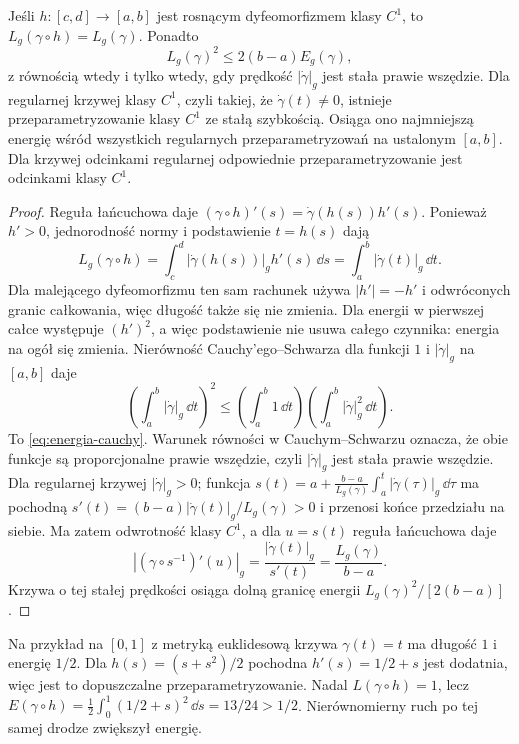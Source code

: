 \begin{stwierdzenie}
\label{prop:energia-dlugosc}
Jeśli $h:[c,d]\to[a,b]$ jest rosnącym dyfeomorfizmem
klasy $C^1$, to
$L_g(\gamma\circ h)=L_g(\gamma)$.
Ponadto
\begin{equation}\label{eq:energia-cauchy}
 L_g(\gamma)^2\leq 2(b-a)E_g(\gamma),
\end{equation}
z równością wtedy i tylko wtedy, gdy prędkość
$|\dot\gamma|_g$ jest stała prawie wszędzie.
Dla regularnej krzywej klasy $C^1$, czyli takiej, że
$\dot\gamma(t)\ne0$, istnieje przeparametryzowanie klasy
$C^1$ ze stałą szybkością. Osiąga ono najmniejszą energię
wśród wszystkich regularnych przeparametryzowań na
ustalonym $[a,b]$. Dla krzywej odcinkami regularnej
odpowiednie przeparametryzowanie jest odcinkami klasy $C^1$.
\end{stwierdzenie}
\begin{proof}
Reguła łańcuchowa daje
$(\gamma\circ h)'(s)=\dot\gamma(h(s))h'(s)$.
Ponieważ $h'>0$, jednorodność normy i podstawienie
$t=h(s)$ dają
\[
 L_g(\gamma\circ h)
 =\int_c^d|\dot\gamma(h(s))|_g h'(s)\,\dd s
 =\int_a^b|\dot\gamma(t)|_g\,\dd t.
\]
Dla malejącego dyfeomorfizmu ten sam rachunek używa
$|h'|=-h'$ i odwróconych granic całkowania, więc długość
także się nie zmienia. Dla energii w pierwszej całce występuje
$(h')^2$, a więc podstawienie nie usuwa całego
czynnika: energia na ogół się zmienia.
Nierówność Cauchy'ego--Schwarza dla funkcji
$1$ i $|\dot\gamma|_g$ na $[a,b]$ daje
\[
 \left(\int_a^b|\dot\gamma|_g\,\dd t\right)^2
 \leq\left(\int_a^b1\,\dd t\right)
      \left(\int_a^b|\dot\gamma|_g^2\,\dd t\right).
\]
To \eqref{eq:energia-cauchy}. Warunek równości
w Cauchym--Schwarzu oznacza, że obie funkcje
są proporcjonalne prawie wszędzie, czyli
$|\dot\gamma|_g$ jest stała prawie wszędzie.
Dla regularnej krzywej $|\dot\gamma|_g>0$;
funkcja
$s(t)=a+\frac{b-a}{L_g(\gamma)}
               \int_a^t|\dot\gamma(\tau)|_g\,\dd\tau$
ma pochodną $s'(t)=(b-a)|\dot\gamma(t)|_g/L_g(\gamma)>0$
i przenosi końce przedziału na siebie.
Ma zatem odwrotność klasy $C^1$, a dla $u=s(t)$
reguła łańcuchowa daje
\[
 \left|(\gamma\circ s^{-1})'(u)\right|_g
 =\frac{|\dot\gamma(t)|_g}{s'(t)}
 =\frac{L_g(\gamma)}{b-a}.
\]
Krzywa o tej stałej prędkości osiąga dolną granicę
energii $L_g(\gamma)^2/[2(b-a)]$.
\end{proof}

Na przykład na $[0,1]$ z metryką euklidesową
krzywa $\gamma(t)=t$ ma długość $1$ i energię $1/2$.
Dla $h(s)=(s+s^2)/2$ pochodna $h'(s)=1/2+s$ jest dodatnia,
więc jest to dopuszczalne przeparametryzowanie.
Nadal $L(\gamma\circ h)=1$, lecz
$E(\gamma\circ h)=\frac12\int_0^1(1/2+s)^2\,\dd s=13/24>1/2$.
Nierównomierny ruch po tej samej drodze zwiększył energię.

